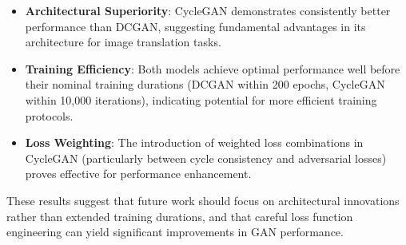 \documentclass{article}
\begin{document}
\begin{itemize}
\item \textbf{Architectural Superiority}: CycleGAN demonstrates consistently better performance than DCGAN, suggesting fundamental advantages in its architecture for image translation tasks.

\item \textbf{Training Efficiency}: Both models achieve optimal performance well before their nominal training durations (DCGAN within 200 epochs, CycleGAN within 10,000 iterations), indicating potential for more efficient training protocols.

\item \textbf{Loss Weighting}: The introduction of weighted loss combinations in CycleGAN (particularly between cycle consistency and adversarial losses) proves effective for performance enhancement.
\end{itemize}

These results suggest that future work should focus on architectural innovations rather than extended training durations, and that careful loss function engineering can yield significant improvements in GAN performance.
\end{document}
